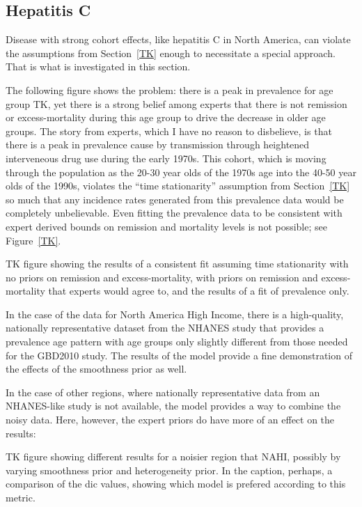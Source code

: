 \subsection{Hepatitis C}
Disease with strong cohort effects, like hepatitis C in North America,
can violate the assumptions from Section~\ref{TK} enough to
necessitate a special approach.  That is what is investigated in this
section.

The following figure shows the problem:  there is a peak in prevalence
for age group TK, yet there is a strong belief among experts that
there is not remission or excess-mortality during this age group to
drive the decrease in older age groups.  The story from experts, which
I have no reason to disbelieve, is that there is a peak in prevalence
cause by transmission through heightened interveneous drug use during
the early 1970s.  This cohort, which is moving through the population
as the 20-30 year olds of the 1970s age into the 40-50 year olds of
the 1990s, violates the ``time stationarity'' assumption from
Section~\ref{TK} so much that any incidence rates generated from this
prevalence data would be completely unbelievable.  Even fitting the
prevalence data to be consistent with expert derived bounds on
remission and mortality levels is not possible; see Figure~\ref{TK}.

TK figure showing the results of a consistent fit assuming time
stationarity with no priors on remission and excess-mortality, with
priors on remission and excess-mortality that experts would agree to,
and the results of a fit of prevalence only.

In the case of the data for North America High Income, there is a
high-quality, nationally representative dataset from the NHANES study
that provides a prevalence age pattern with age groups only slightly
different from those needed for the GBD2010 study.  The results of the
model provide a fine demonstration of the effects of the smoothness
prior as well.

In the case of other regions, where nationally representative data
from an NHANES-like study is not available, the model provides a way
to combine the noisy data.  Here, however, the expert priors do have
more of an effect on the results:

TK figure showing different results for a noisier region that NAHI,
possibly by varying smoothness prior and heterogeneity prior.  In the
caption, perhaps, a comparison of the dic values, showing which model
is prefered according to this metric.

